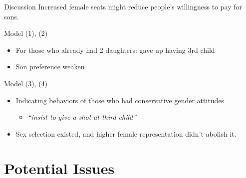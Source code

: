 \documentclass[
  9pt,
  ignorenonframetext,
  aspectratio=43,
]{beamer}
\providecommand{\tightlist}{%
  \setlength{\itemsep}{0pt}\setlength{\parskip}{0pt}}
\begin{document}
\begin{frame}{Discussion}
\protect\hypertarget{discussion}{}
Increased female seats might reduce people's willingness to pay for
sons.

\begin{block}{Model (1), (2)}
\protect\hypertarget{model-1-2}{}
\begin{itemize}
\tightlist
\item
  For those who already had 2 daughters: gave up having 3rd child
\item
  Son preference weaken
\end{itemize}
\end{block}

\begin{block}{Model (3), (4)}
\protect\hypertarget{model-3-4}{}
\begin{itemize}
\tightlist
\item
  Indicating behaviors of those who had conservative gender attitudes

  \begin{itemize}
  \tightlist
  \item
    \emph{``insist to give a shot at third child''}
  \end{itemize}
\item
  Sex selection existed, and higher female representation didn't abolish
  it.
\end{itemize}
\end{block}
\end{frame}

\hypertarget{potential-issues}{%
\section{Potential Issues}\label{potential-issues}}
\end{document}
